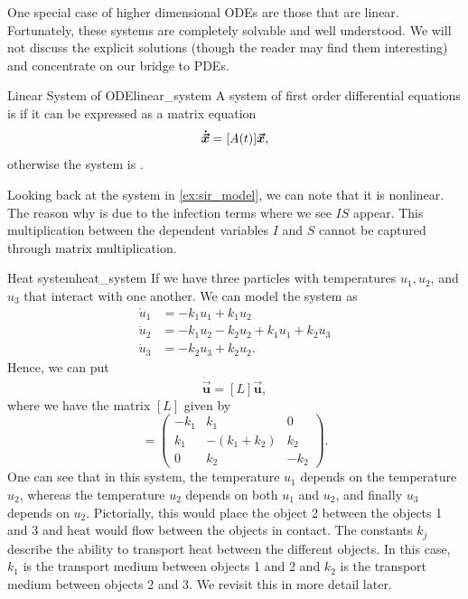        One special case of higher dimensional ODEs are those that are linear. Fortunately, these systems are completely solvable and well understood. We will not discuss the explicit solutions (though the reader may find them interesting) and concentrate on our bridge to PDEs.
        
        \begin{df}{Linear System of ODE}{linear_system}
            A system of first order differential equations is  if it can be expressed as a matrix equation
            \[
            \boldsymbol{\dot{\vec{x}}} = [A(t)]\boldsymbol{\vec{x}},
            \]
            otherwise the system is . 
        \end{df}
        
        Looking back at the system in \cref{ex:sir_model}, we can note that it is nonlinear. The reason why is due to the infection terms where we see $IS$ appear. This multiplication between the dependent variables $I$ and $S$ cannot be captured through matrix multiplication. 

        \begin{ex}{Heat system}{heat_system}
        If we have three particles with temperatures $u_1,u_2$, and $u_3$ that interact with one another. We can model the system as 
        \begin{align}
        \dot{u}_1 &= -k_1 u_1 + k_1 u_2\\
        \dot{u}_2 &= -k_1 u_2 -k_2 u_2 + k_1 u_1 + k_2 u_3\\
        \dot{u}_3 &= -k_2 u_3 + k_2 u_2.
        \end{align}
        Hence, we can put
        \begin{equation}
        \boldsymbol{\dot{\vec{u}}} = [L] \boldsymbol{\vec{u}},
        \end{equation}
        where we have the matrix $[L]$ given by
        \begin{equation}
        [L] = \begin{pmatrix} -k_1 & k_1 & 0 \\ k_1 & -(k_1+k_2) & k_2 \\ 0 & k_2 & -k_2 \end{pmatrix}.
        \end{equation}
        One can see that in this system, the temperature $u_1$ depends on the temperature $u_2$, whereas the temperature $u_2$ depends on both $u_1$ and $u_2$, and finally $u_3$ depends on $u_2$. Pictorially, this would place the object 2 between the objects 1 and 3 and heat would flow between the objects in contact. The constants $k_j$ describe the ability to transport heat between the different objects. In this case, $k_1$ is the transport medium between objects 1 and 2 and $k_2$ is the transport medium between objects 2 and 3. We revisit this in more detail later.
        \end{ex}

